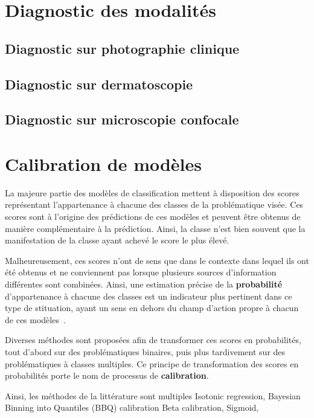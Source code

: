 \section{Diagnostic des modalités}
\subsection{Diagnostic sur photographie clinique}
\subsection{Diagnostic sur dermatoscopie}
\subsection{Diagnostic sur microscopie confocale}
\clearpage

\section{Calibration de modèles}
La majeure partie des modèles de classification mettent à disposition des scores représentant l'appartenance à chacune des classes de la problématique visée. Ces scores sont à l'origine des prédictions de ces modèles et peuvent être obtenus de manière complémentaire à la prédiction. Ainsi, la classe n'est bien souvent que la manifestation de la classe ayant achevé le score le plus élevé.\par

Malheureusement, ces scores n'ont de sens que dans le contexte dans lequel ils ont été obtenus et ne conviennent pas lorsque plusieurs sources d'information différentes sont combinées. Ainsi, une estimation précise de la \textbf{probabilité} d'appartenance à chacune des classes est un indicateur plus pertinent dans ce type de stituation, ayant un sens en dehors du champ d'action propre à chacun de ces modèles~\cite{Zadrozny2002}.\par

Diverses méthodes sont proposées afin de transformer ces scores en probabilités, tout d'abord sur des problématiques binaires, puis plus tardivement sur des problématiques à classes multiples. Ce principe de transformation des scores en probabilités porte le nom de processus de \textbf{calibration}.\par

Ainsi, les méthodes de la littérature sont multiples
Isotonic regression, \cite{Zadrozny2002}
Bayesian Binning into Quantiles (BBQ) calibration\cite{Naeini2015}
Beta calibration,\cite{Kull2017}
Sigmoid,\cite{kull2017b}

